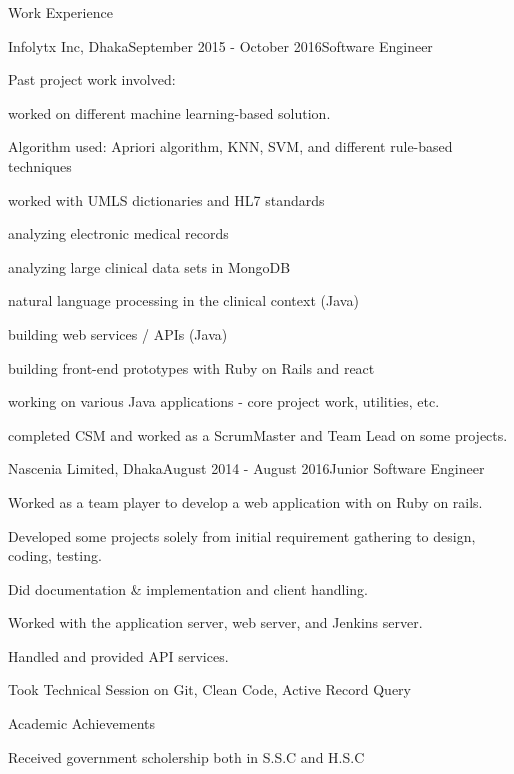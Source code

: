 \documentclass{resume} %
\begin{document}
\begin{rSection}{Work Experience}
\begin{rSubsection}{Infolytx Inc, Dhaka}{September 2015 - October 2016}{Software Engineer}{}
\item Past project work involved: 
\item worked on different machine learning-based solution. 
\item Algorithm used:  Apriori algorithm, KNN, SVM, and different rule-based techniques 
\item worked with UMLS dictionaries and HL7 standards
\item analyzing electronic medical records
\item analyzing large clinical data sets in MongoDB
\item natural language processing in the clinical context (Java)
\item building web services / APIs (Java)
\item building front-end prototypes with  Ruby on Rails and react
\item working on various Java applications - core project work, utilities, etc.
\item completed CSM and worked as a ScrumMaster and Team Lead on some projects.
\end{rSubsection}

\begin{rSubsection}{Nascenia Limited, Dhaka}{August 2014 - August 2016}{Junior Software Engineer}{}
\item Worked as a team player to develop a web application with on Ruby on rails.
\item Developed some projects solely from initial requirement gathering to design, coding, testing.
\item Did documentation \& implementation and client handling.
\item Worked with the application server, web server, and Jenkins server.
\item Handled and provided API services. 
\item Took Technical Session on Git, Clean Code, Active Record Query 
\end{rSubsection}

\end{rSection}



\begin{rSection}{Academic Achievements} 
\item Received government scholership both in S.S.C  and H.S.C
\end{rSection}
\end{document}
